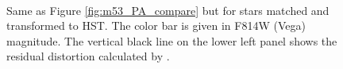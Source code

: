 \documentclass[]{spie}  %
\begin{document}
\begin{figure}[!h]
  \centering
  \\
  \hspace{-1cm}
  \caption{Same as Figure \ref{fig:m53_PA_compare} but for stars matched and transformed to HST. The color bar is given in F814W (Vega) magnitude. The vertical black line on the lower left panel shows the residual distortion calculated by \cite{service:2016a}.} \label{fig:m53_PA_compare_hst}
\end{figure}
\end{document}
